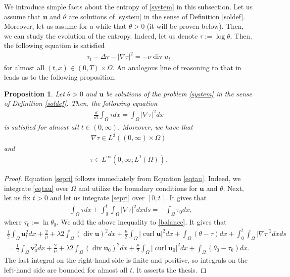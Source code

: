 \documentclass[11pt]{article}
\numberwithin{equation}{section}
\theoremstyle{plain}
\newtheorem{prop}[defi]{Proposition}
\newcommand\bb[1]{\mathbf{#1}}
\newcommand{\tn}{\Omega}
\newcommand{\io}{\int_{\Omega}}
\newcommand{\ul}{\frac{1}{2}}
\newcommand{\ddt}{\frac{d}{dt}}
\renewcommand{\div}{\operatorname{div}}
\DeclareMathOperator{\curl}{curl}
\newcommand{\wspnd}{2\mu+\lambda}
\newcommand{\bu}{\bb{u}}
\begin{document}
We introduce simple facts about the entropy of \eqref{system} in this subsection. Let us assume that $\bu$ and $\theta$ are solutions of \eqref{system} in the sense of Definition \ref{soldef}. Moreover, let us assume for a while that $\theta>0$ (it will be proven below). Then, we can study the evolution of the entropy. Indeed, let us denote $\tau:=\log\theta$. Then, the following equation is satisfied
\begin{align}\label{eqtau}
\tau_t-\Delta\tau-|\nabla\tau|^2=-\nu\div u_t
\end{align}
for almost all $(t,x)\in (0,T)\times\tn$.
An analogous line of reasoning to that in \cite{CMT} leads us to the following proposition.
\begin{prop}\label{ogrzprop}
Let $\theta>0$ and $\bu$ be solutions of the problem \eqref{system} in the sense of Definition \ref{soldef}. Then, the following equation
\begin{align}\label{sepri}
\ddt\io\tau dx=\io|\nabla\tau|^2dx
\end{align}
is satisfied for almost all $t\in (0,\infty)$. Moreover, we have that
\begin{align*}
\nabla\tau\in L^2((0,\infty)\times \tn)
\end{align*}
and
\begin{align*}
\tau\in L^{\infty}(0,\infty;L^1(\tn)).
\end{align*}
\end{prop}
\begin{proof}
Equation \eqref{sepri} follows immediately from Equation \eqref{eqtau}. Indeed, we integrate \eqref{eqtau} over $\Omega$ and utilize the boundary conditions for $\bu$ and $\theta$. Next, let us fix $t>0$ and let us integrate \eqref{sepri} over $[0,t]$. It gives that 
\begin{align*}
-\io\tau dx+\int_0^t\io|\nabla\tau|^2dxds=-\io\tau_0dx,
\end{align*}
where $\tau_0:=\ln\theta_0$. We add the above inequality to \eqref{balance}. It gives that
\begin{align*}
\ul\io \bb u_t^2dx+\frac\wspnd2\io (\div\bb u)^2dx+\frac\mu2\io|\curl \bb u|^2dx+\io(\theta-\tau) dx+\int_0^t\io|\nabla\tau|^2dxds\\
=\ul\io \bb v_0^2dx+\frac\wspnd2\io (\div\bb u_0)^2dx+\frac\mu2\io|\curl \bb u_0|^2dx+\io(\theta_0-\tau_0)dx.
\end{align*}
The last integral on the right-hand side is finite and positive, so integrals on the left-hand side are bounded for almost all $t$. It asserts the thesis.
\end{proof}
\end{document}

